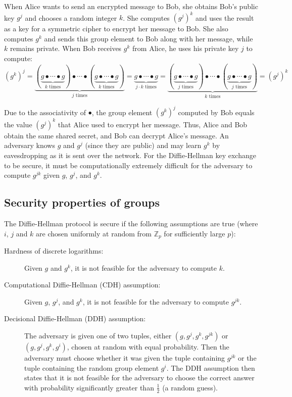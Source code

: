 \documentclass[manuscript]{acmart}
\begin{document}
When Alice wants to send an encrypted message to Bob, she obtains Bob's public key $g^j$ and chooses a random integer $k$.
She computes $(g^j)^k$ and uses the result as a key for a symmetric cipher to encrypt her message to Bob.
She also computes $g^k$ and sends this group element to Bob along with her message, while $k$ remains private.
When Bob receives $g^k$ from Alice, he uses his private key $j$ to compute:
\begin{equation*}
(g^k)^j =
\underbrace{(\underbrace{g \bullet\cdots\bullet g}_\text{$k$ times}) \bullet\cdots\bullet (\underbrace{g \bullet\cdots\bullet g}_\text{$k$ times})}_\text{$j$ times} =
\underbrace{g \bullet\cdots\bullet g}_\text{$j \cdot k$ times} =
\underbrace{(\underbrace{g \bullet\cdots\bullet g}_\text{$j$ times}) \bullet\cdots\bullet (\underbrace{g \bullet\cdots\bullet g}_\text{$j$ times})}_\text{$k$ times} =
(g^j)^k
\end{equation*}

Due to the associativity of $\bullet$, the group element $(g^k)^j$ computed by Bob equals the value $(g^j)^k$ that Alice used to encrypt her message.
Thus, Alice and Bob obtain the same shared secret, and Bob can decrypt Alice's message.
An adversary knows $g$ and $g^j$ (since they are public) and may learn $g^k$ by eavesdropping as it is sent over the network.
For the Diffie-Hellman key exchange to be secure, it must be computationally extremely difficult for the adversary to compute $g^{jk}$ given $g$, $g^j$, and $g^k$.

\subsection{Security properties of groups}\label{sec:cdh-ddh}

The Diffie-Hellman protocol is secure if the following assumptions are true (where $i$, $j$ and $k$ are chosen uniformly at random from $\mathbb{Z}_p$ for sufficiently large $p$):

\begin{description}
\item[Hardness of discrete logarithms:]
    Given $g$ and $g^k$, it is not feasible for the adversary to compute $k$.
\item[Computational Diffie-Hellman (CDH) assumption:]
    Given $g$, $g^j$, and $g^k$, it is not feasible for the adversary to compute $g^{jk}$.
\item[Decisional Diffie-Hellman (DDH) assumption:]
    The adversary is given one of two tuples, either $(g, g^j, g^k, g^{jk})$ or $(g, g^j, g^k, g^i)$, chosen at random with equal probability.
    Then the adversary must choose whether it was given the tuple containing $g^{jk}$ or the tuple containing the random group element $g^i$.
    The DDH assumption then states that it is not feasible for the adversary to choose the correct answer with probability significantly greater than $\frac{1}{2}$ (a random guess).
\end{description}
\end{document}

